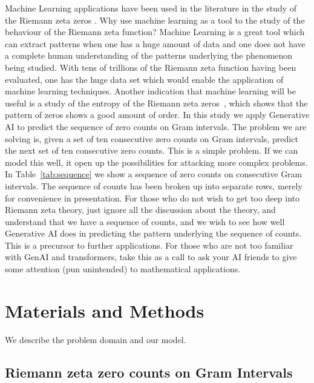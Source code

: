 \documentclass[twoside]{article}
\begin{document}
 Machine Learning applications have been used in the literature in the study of the Riemann zeta zeros \cite{osneural,Shanker 2018a,osentropy}.
Why use machine learning  as a tool to the study of the behaviour of the Riemann zeta function?  Machine Learning is a great tool which can extract patterns when one has a huge amount of data and one does not have a complete human understanding of the patterns underlying the phenomenon being studied. With tens of trillions of the Riemann zeta function having been evaluated, one has the huge data set which would enable the application of machine learning techniques. Another indication that machine learning will be useful is a study of the entropy of the Riemann zeta zeros~\cite{osentropy}, which shows that the pattern of zeros shows a good amount of order. In this study we apply Generative AI to predict the sequence of zero counts on Gram intervals. The problem we are solving is, given a set of ten consecutive zero counts on Gram intervals, predict the next set of ten consecutive zero counts. This is a simple problem. If we can model this well, it open up the possibilities for attacking more complex problems. In Table~\ref{tab:sequence} we show a sequence of zero counts on consecutive Gram intervals. The sequence of counts has been broken up into separate rows, merely for convenience in presentation. For those who do not wish to get too deep into Riemann zeta theory, just ignore all the discussion about the theory, and understand that we have a sequence of counts, and we wish to see how well Generative AI does in predicting the pattern underlying the sequence of counts. This is a precursor to further applications. For those who are not too familiar with GenAI and transformers, take this as a call to ask your AI friends to give some attention (pun unintended) to mathematical applications.


\section{\label{sec2}Materials and Methods}
We describe the problem domain and our model.

\subsection{\label{seckaratsuba}Riemann zeta zero counts on Gram Intervals}
\end{document}
